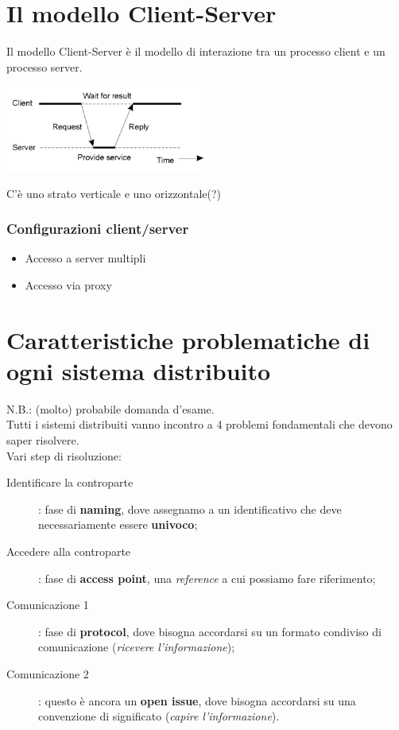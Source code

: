 \section{Il modello Client-Server}
Il modello Client-Server è il modello di interazione tra un processo client e un processo server.
\begin{center}
    \includegraphics[width=0.5\textwidth]{img/modelloCS1.jpg}
\end{center}
C'è uno strato verticale e uno orizzontale(?)
\subsubsection{Configurazioni client/server}
\begin{itemize}
    \item Accesso a server multipli
    \item Accesso via proxy
\end{itemize}

\section{Caratteristiche problematiche di ogni sistema distribuito}
N.B.: (molto) probabile domanda d'esame.
\\Tutti i sistemi distribuiti vanno incontro a 4 problemi fondamentali che devono saper risolvere.
\\Vari step di risoluzione:
\begin{description}
    \item[Identificare la controparte]: fase di \textbf{naming}, dove assegnamo a  un identificativo che deve necessariamente essere \textbf{univoco}; 
    \item[Accedere alla controparte]: fase di \textbf{access point}, una \textit{reference} a cui possiamo fare riferimento;
    \item[Comunicazione 1]: fase di \textbf{protocol}, dove bisogna accordarsi su un formato condiviso di comunicazione (\textit{ricevere l'informazione});
    \item[Comunicazione 2]: questo è ancora un \textbf{open issue}, dove bisogna accordarsi su una convenzione di significato (\textit{capire l'informazione}).
\end{description}

